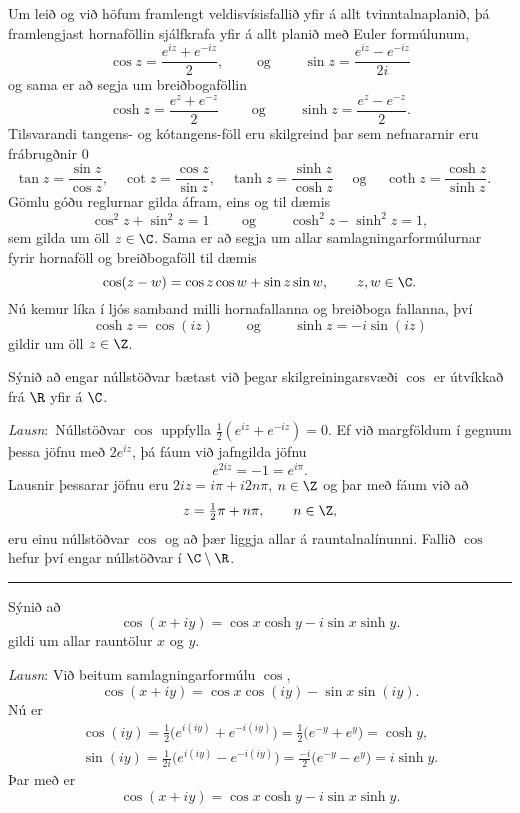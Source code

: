 Um leið og við höfum framlengt veldisvísisfallið
yfir á allt tvinntalnaplanið, þá framlengjast  hornaföllin 
sjálfkrafa yfir á allt planið með Euler formúlunum,
$$
\cos z =\dfrac{e^{iz}+e^{-iz}}2, \qquad \text{ og } \qquad 
\sin z =\dfrac{e^{iz}-e^{-iz}}{2i} 
$$
og sama er að segja um breiðbogaföllin
$$
\cosh z =\dfrac{e^{z}+e^{-z}}2 \qquad \text{ og } \qquad  
\sinh z =\dfrac{e^{z}-e^{-z}}{2}.
$$
Tilsvarandi tangens- og kótangens-föll eru skilgreind þar sem
nefnararnir eru frábrugðnir $0$
$$
\tan z=\dfrac {\sin z}{\cos z}, \quad
\cot z=\dfrac {\cos z}{\sin z}, \quad
\tanh z=\dfrac {\sinh z}{\cosh z} \quad \text{ og } \quad
\coth z=\dfrac {\cosh z}{\sinh z}. \quad
$$
Gömlu góðu reglurnar gilda áfram, eins og til dæmis
$$
\cos^2z+\sin^2z=1  \qquad \text{ og } \qquad \cosh^2z-\sinh^2z=1,
$$
sem gilda um öll $z\in \C$.  Sama er að segja um allar
samlagningarformúlurnar fyrir hornaföll og breiðbogaföll til dæmis
$$
\cos(z-w)=\cos z\cos w+\sin z\sin w, \qquad z,w\in \C.
$$
Nú kemur líka í ljós samband milli  hornafallanna og breiðboga 
fallanna, því
$$
\cosh z=\cos(iz) \qquad \text{  og } \qquad \sinh z=-i \sin(iz)
$$
gildir um öll $z\in \Z$.


\begin{sy} Sýnið að engar núllstöðvar bætast
við þegar skilgreiningarsvæði $\cos$ er útvíkkað frá $\R$ yfir á $\C$.

\smallskip\noindent
{\it Lausn}:\  Núllstöðvar $\cos$ uppfylla $\tfrac
12(e^{iz}+e^{-iz})=0$.  Ef við margföldum í gegnum þessa jöfnu með
$2e^{iz}$, þá fáum við jafngilda jöfnu
$$
e^{2iz}=-1=e^{i\pi}.
$$
Lausnir þessarar jöfnu eru
$2iz=i{\pi}+i2n{\pi}$, $n\in \Z$ og þar með fáum við að
$$
z=\tfrac 12 {\pi}+n{\pi}, \qquad n\in \Z,
$$
eru einu núllstöðvar $\cos$ og að þær liggja allar á
rauntalnalínunni.   Fallið $\cos$ hefur því engar núllstöðvar í
$\C\setminus \R$. 
\end{sy}


\bigskip\hrule\bigskip


\begin{sy}  Sýnið að 
$$
\cos(x+iy)=\cos x\cosh y-i\sin x\sinh y.
$$
gildi um allar rauntölur $x$ og $y$.

\smallskip\noindent
{\it Lausn}:  Við beitum samlagningarformúlu $\cos$,
$$
\cos(x+iy)=\cos x\cos(iy)-\sin x\sin (iy).
$$
Nú er
\begin{gather*}
\cos(iy)=\tfrac 12\big(e^{i(iy)}+e^{-i(iy)}\big)=
\tfrac 12 \big(e^{-y}+e^y\big)=\cosh y,\\
\sin(iy)=\tfrac 1{2i}\big(e^{i(iy)}-e^{-i(iy)}\big)=
\tfrac {-i} 2\big(e^{-y}-e^y\big)=i\sinh y.
\end{gather*}
Þar með er
$$
\cos(x+iy)=\cos x\cosh y-i\sin x\sinh y.
$$
\end{sy}


